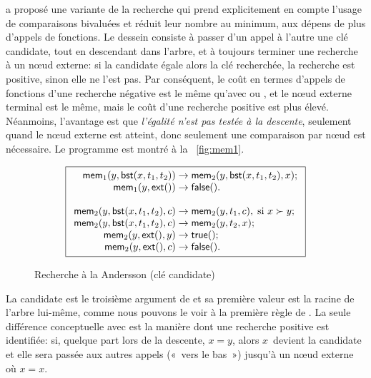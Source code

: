 
\cite{Andersson_1991} a proposé une variante de la recherche qui prend
explicitement en compte l'usage de comparaisons bivaluées et réduit
leur nombre au minimum, aux dépens de plus d'appels de fonctions. Le
dessein consiste à passer d'un appel à l'autre une clé candidate, tout
en descendant dans l'arbre, et à toujours terminer une recherche à un
n{\oe}ud externe: si la candidate égale alors la clé recherchée, la
recherche est positive, sinon elle ne l'est pas. Par conséquent, le
coût en termes d'appels de fonctions d'une recherche négative est le
même qu'avec  ou
, et le n{\oe}ud externe
terminal est le même, mais le coût d'une recherche positive est plus
élevé. Néanmoins, l'avantage est que \emph{l'égalité n'est pas testée
  à la descente}, seulement quand le n{\oe}ud externe est atteint,
donc seulement une comparaison par n{\oe}ud est nécessaire. Le
programme est montré à la \fig~\vref{fig:mem1}.
\begin{figure}
\begin{equation*}
\boxed{
\begin{array}{r@{\;}l@{\;}l}
\fun{mem}_1(y,\fun{bst}(x,t_1,t_2)) & \rightarrow &
  \fun{mem}_2(y,\fun{bst}(x,t_1,t_2),x);\\
\fun{mem}_1(y,\fun{ext}()) & \rightarrow & \fun{false}().\\
\\
\fun{mem}_2(y,\fun{bst}(x,t_1,t_2),c) & \rightarrow &
  \fun{mem}_2(y,t_1,c),\; \text{si \(x \succ y\)};\\
\fun{mem}_2(y,\fun{bst}(x,t_1,t_2),c) & \rightarrow &
  \fun{mem}_2(y,t_2,x);\\
\fun{mem}_2(y,\fun{ext}(),y) & \rightarrow & \fun{true}();\\
\fun{mem}_2(y,\fun{ext}(),c) & \rightarrow & \fun{false}().
\end{array}}
\end{equation*}
\caption{Recherche à la Andersson (clé candidate)\label{fig:mem1}}
\end{figure}
La candidate est le troisième argument de
 et sa première valeur
est la racine de l'arbre lui-même, comme nous pouvons le voir à la
première règle de . La
seule différence conceptuelle avec
 est la manière dont
une recherche positive est identifiée: si, quelque part lors de la
descente, \(x = y \), alors \(x\)~devient la candidate et elle sera
passée aux autres appels («~vers le bas~») jusqu'à un n{\oe}ud externe
où \(x = x\).

